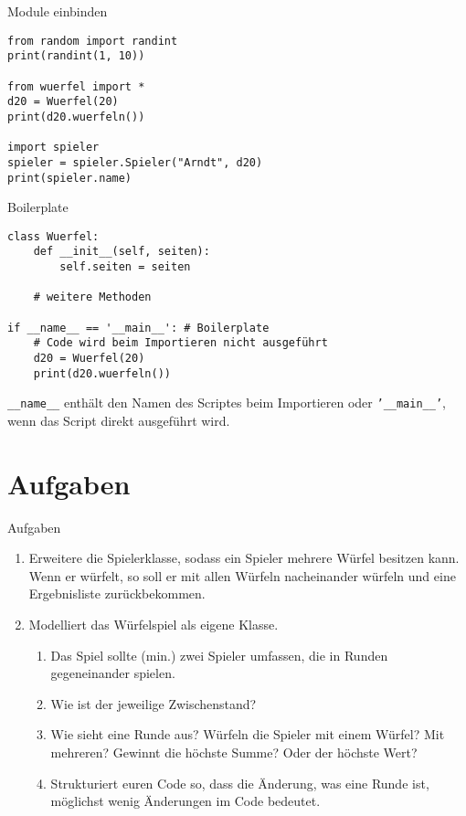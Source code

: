 \begin{frame}[fragile]{Module einbinden}
	\begin{lstlisting}
from random import randint
print(randint(1, 10))

from wuerfel import *
d20 = Wuerfel(20)
print(d20.wuerfeln())

import spieler
spieler = spieler.Spieler("Arndt", d20)
print(spieler.name)
	\end{lstlisting}
\end{frame}


\begin{frame}[fragile]{Boilerplate}
	\begin{lstlisting}
class Wuerfel:
    def __init__(self, seiten):
        self.seiten = seiten
	
    # weitere Methoden

if __name__ == '__main__': # Boilerplate
    # Code wird beim Importieren nicht ausgeführt
    d20 = Wuerfel(20)
    print(d20.wuerfeln())
	\end{lstlisting}

	\texttt{\_\_name\_\_} enthält den Namen des Scriptes beim Importieren
	oder \texttt{'\_\_main\_\_'}, wenn das Script direkt ausgeführt wird.

\end{frame}



\section{Aufgaben}

\begin{frame}{Aufgaben}
	\begin{enumerate}
		\item Erweitere die Spielerklasse, sodass ein Spieler mehrere Würfel besitzen kann. Wenn er würfelt, so soll er mit allen Würfeln nacheinander würfeln und eine Ergebnisliste zurückbekommen.
		\item Modelliert das Würfelspiel als eigene Klasse.
			\begin{enumerate}
				\item Das Spiel sollte (min.) zwei Spieler umfassen, die in Runden gegeneinander spielen.
				\item Wie ist der jeweilige Zwischenstand?
				\item Wie sieht eine Runde aus? Würfeln die Spieler mit einem Würfel? Mit mehreren? Gewinnt die höchste Summe? Oder der höchste Wert?
				\item Strukturiert euren Code so, dass die Änderung, was eine Runde ist, möglichst wenig Änderungen im Code bedeutet.
			\end{enumerate}
	\end{enumerate}
\end{frame}

